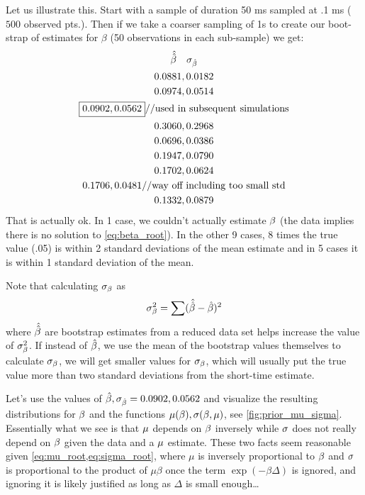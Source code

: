 \documentclass{article}
\begin{document}
Let us illustrate this. Start with a sample of duration 50 ms sampled at .1 ms ($500$ observed pts.). Then if we
take a coarser sampling of 1s to create our boot-strap of estimates for $\beta$
(50 observations in each sub-sample) we get:
\begin{equation*}
\begin{gathered}
\hat {\hat \beta} \quad {\sigma }_{\hat{{\beta}}} \\
0.0881, 0.0182\\
0.0974, 0.0514\\
\boxed{0.0902, 0.0562} // \textrm{used in subsequent simulations}\\
0.3060, 0.2968\\
0.0696, 0.0386\\
0.1947, 0.0790\\
0.1702, 0.0624\\
0.1706, 0.0481  // \textrm{way off including too small std}\\
 0.1332, 0.0879\\
\end{gathered}
\end{equation*}
That is actually ok. In 1 case, we couldn't actually estimate ${\beta}$ (the data
implies there is no solution to \cref{eq:beta_root}). In the other 9 cases, 8
times the true value (.05) is within 2 standard deviations of the mean estimate
and in 5 cases it is within 1 standard deviation of the mean.

Note that calculating ${\sigma }_{\beta}$ as $$ {\sigma }_{\beta}^2 = \sum(\hat{ \hat {{\beta}}} - \hat {{\beta}})^2
$$ where $\hat{ \hat {{\beta}}}$ are bootstrap estimates from a reduced data set helps
increase the value of ${\sigma }_{\beta}^2$. If instead of $\hat {{\beta}}$, we use the mean of the
bootstrap values themselves to calculate ${\sigma }_{\beta}$, we will get smaller values for
${\sigma }_{\beta}$, which will usually put the true value more than two standard deviations
from the short-time estimate.

Let's use the values of $\hat \beta, {\sigma }_{\hat{{\beta}}} =  0.0902, 0.0562$ and
visualize the resulting distributions for ${\beta}$ and the functions ${\mu }({\beta}),
{\sigma }({\beta}, {\mu })$, see \cref{fig:prior_mu_sigma}. Essentially what we see is that ${\mu }$
depends on ${\beta}$ inversely while ${\sigma }$ does not really depend on ${\beta}$ given the
data and a ${\mu }$ estimate. These two facts seem reasonable given
\cref{eq:mu_root,eq:sigma_root}, where $\mu$ is inversely proportional to
${\beta}$ and ${\sigma }$ is proportional to the product of $\mu \beta$ once the term
$\exp(-\beta \Delta)$ is ignored, and ignoring it is likely justified as long as
$\Delta$ is small enough\ldots
\end{document}
